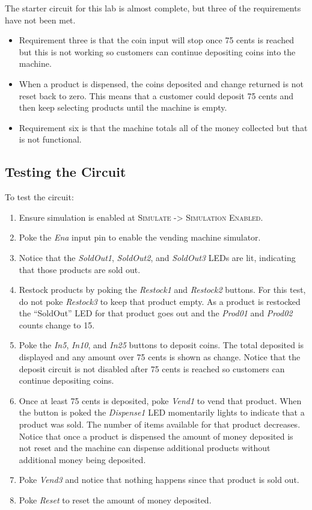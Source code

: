 The starter circuit for this lab is almost complete, but three of the requirements have not been met.

\begin{itemize}
	\item Requirement three is that the coin input will stop once 75 cents is reached but this is not working so customers can continue depositing coins into the machine.
	\item When a product is dispensed, the coins deposited and change returned is not reset back to zero. This means that a customer could deposit 75 cents and then keep selecting products until the machine is empty.
	\item Requirement six is that the machine totals all of the money collected but that is not functional.
\end{itemize}

\subsection{Testing the Circuit}

To test the circuit:

\begin{enumerate}
	\item Ensure simulation is enabled at \textsc{Simulate -> Simulation Enabled}.
	\item Poke the \textit{Ena} input pin to enable the vending machine simulator.
	\item Notice that the \textit{SoldOut1}, \textit{SoldOut2}, and \textit{SoldOut3} LEDs are lit, indicating that those products are sold out.
	\item Restock products by poking the \textit{Restock1} and \textit{Restock2} buttons. For this test, do not poke \textit{Restock3} to keep that product empty. As a product is restocked the ``SoldOut'' LED for that product goes out and the \textit{Prod01} and \textit{Prod02} counts change to 15.
	\item Poke the \textit{In5}, \textit{In10}, and \textit{In25} buttons to deposit coins. The total deposited is displayed and any amount over 75 cents is shown as change. Notice that the deposit circuit is not disabled after 75 cents is reached so customers can continue depositing coins.
	\item Once at least 75 cents is deposited, poke \textit{Vend1} to vend that product. When the button is poked the \textit{Dispense1} LED momentarily lights to indicate that a product was sold. The number of items available for that product decreases. Notice that once a product is dispensed the amount of money deposited is not reset and the machine can dispense additional products without additional money being deposited.
	\item Poke \textit{Vend3} and notice that nothing happens since that product is sold out.
	\item Poke \textit{Reset} to reset the amount of money deposited.
\end{enumerate}

